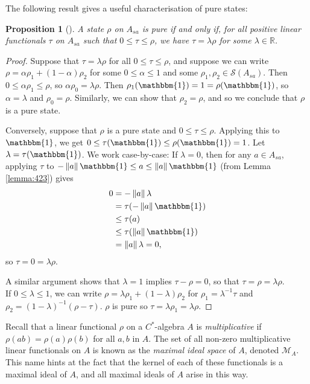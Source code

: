 \documentclass[11pt,a4paper]{report}
\theoremstyle{plain}
\newtheorem{prop}{Proposition}
\theoremstyle{definition}
\newcommand{\1}{\mathbbm{1}}
\newcommand{\R}{\mathbb{R}}
\newcommand{\M}{\mathcal{M}}
\renewcommand{\S}{\mathscr{S}}
\begin{document}
The following result gives a useful characterisation of pure states:
\begin{prop}[{\cite[3.4.6]{kadison83}}]\label{prop:pure2}
	A state $\rho$ on $A_{sa}$ is pure if and only if, for all positive linear functionals $\tau$ on
	 $A_{sa}$ such that $0\leq\tau\leq\rho$, we have $\tau =\lambda\rho$ for some $\lambda\in\R$. 
\end{prop}
\begin{proof}
	Suppose that $\tau =\lambda\rho$ for all $0\leq\tau\leq\rho$, and suppose we can write 
	$\rho=\alpha\rho_1+(1-\alpha)\rho_2$ for some $0\leq\alpha\leq1$ and some $\rho_1,\rho_2 \in
	\S(A_{sa})$. Then $0\leq\alpha\rho_1\leq\rho$, so $\alpha\rho_0 = \lambda\rho$. Then 
	$\rho_1(\1)=1=\rho(\1)$, so $\alpha = \lambda$ and $\rho_0 =\rho$. Similarly, we can show that 
	$\rho_2=\rho$, and so we conclude that $\rho$ is a pure state.
	
	Conversely, suppose that $\rho$ is a pure state and $0\leq\tau\leq\rho$. Applying this to $\1$,
	we get $0\leq\tau(\1)\leq\rho(\1) = 1$. Let $\lambda = \tau(\1)$. We work case-by-case: 
	If $\lambda=0$, then for any $a\in A_{sa}$, applying $\tau$ to $-\left\|a\right\|\1 \leq a \leq\left\|a\right\|\1$ (from Lemma \ref{lemma:423}) gives
	\begin{align*}
		0&=		-\left\|a\right\|\lambda 				\\
		&= 		\tau(-\left\|a\right\|\1) 				\\
		&\leq 	\tau(a) 								\\
		&\leq 	\tau(\left\|a\right\|\1) 				\\
		&= 		\left\|a\right\| \lambda = 0,
	\end{align*}
	so $\tau=0=\lambda\rho$.
	
	A similar argument shows that $\lambda=1$ implies $\tau-\rho=0$, so that $\tau=\rho=\lambda\rho$.\\
	If $0\leq\lambda\leq 1$, we can write $\rho=\lambda\rho_1+(1-\lambda)\rho_2$ for 
	$\rho_1=\lambda^{-1}\tau$ and $\rho_2=(1-\lambda)^{-1}(\rho-\tau)$. $\rho$ is pure so 
	$\tau=\lambda\rho_1=\lambda\rho$.
	
\end{proof}
Recall that a linear functional $\rho$ on a $C^\ast$-algebra $A$ is 
\emph{multiplicative} if $\rho(ab)=\rho(a)\rho(b)$ for all $a,b$ in $A$. The set 
of all non-zero multiplicative linear functionals on $A$ is known as the 
\emph{maximal ideal space} of $A$, denoted $\M_A$. This name hints at the fact 
that the kernel of each of these functionals is a maximal ideal of $A$, and all 
maximal ideals of $A$ arise in this way. \cite[Theorem I.2.5]{davidson96}
\end{document}

